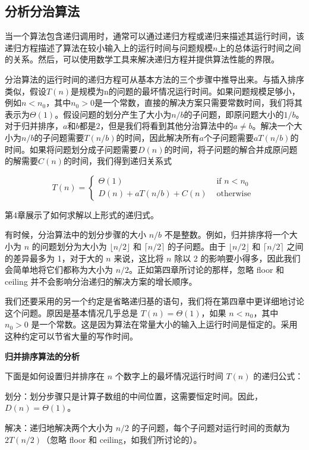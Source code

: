\documentclass[lang=cn,newtx,10pt,scheme=chinese]{elegantbook}
\begin{document}
\subsection{分析分治算法}

当一个算法包含递归调用时，通常可以通过递归方程或递归来描述其运行时间，该递归方程描述了算法在较小输入上的运行时间与问题规模$n$上的总体运行时间之间的关系。然后，可以使用数学工具来解决递归方程并提供算法性能的界限。

分治算法的运行时间的递归方程可从基本方法的三个步骤中推导出来。与插入排序类似，假设$T(n)$是规模为n的问题的最坏情况运行时间。如果问题规模足够小，例如$n < n_0$，其中$n_0 > 0$是一个常数，直接的解决方案只需要常数时间，我们将其表示为$\Theta(1)$。假设问题的划分产生了大小为$n/b$的子问题，即原问题大小的$1/b$。对于归并排序，$a$和$b$都是$2$，但是我们将看到其他分治算法中的$a\neq b$。解决一个大小为$n/b$的子问题需要$T(n/b)$的时间，因此解决所有$a$个子问题需要$aT(n/b)$的时间。如果将问题划分成子问题需要$D(n)$的时间，将子问题的解合并成原问题的解需要$C(n)$的时间，我们得到递归关系式

$$
T(n)= \begin{cases}\Theta(1) & \text { if } n<n_0 \\ D(n)+a T(n / b)+C(n) & \text { otherwise }\end{cases}
$$

第4章展示了如何求解以上形式的递归式。

有时候，分治算法中的划分步骤的大小 $n/b$ 不是整数。例如，归并排序将一个大小为 $n$ 的问题划分为大小为 $\lfloor{n/2}\rfloor$ 和 $\lceil{n/2}\rceil$ 的子问题。由于 $\lfloor{n/2}\rfloor$ 和 $\lceil{n/2}\rceil$ 之间的差异最多为 1，对于大的 $n$ 来说，这比将 $n$ 除以 2 的影响要小得多，因此我们会简单地将它们都称为大小为 $n/2$。正如第四章所讨论的那样，忽略 floor 和 ceiling 并不会影响分治递归的解决方案的增长顺序。

我们还要采用的另一个约定是省略递归基的语句，我们将在第四章中更详细地讨论这个问题。原因是基本情况几乎总是 $T(n)=\Theta(1)$，如果 $n < n_0$，其中 $n_0 > 0$ 是一个常数。这是因为算法在常量大小的输入上运行时间是恒定的。采用这种约定可以节省大量的写作时间。

\textbf{归并排序算法的分析}

下面是如何设置归并排序在 $n$ 个数字上的最坏情况运行时间 $T(n)$ 的递归公式：

划分：划分步骤只是计算子数组的中间位置，这需要恒定时间。因此，$D(n)=\Theta(1)$。

解决：递归地解决两个大小为 $n/2$ 的子问题，每个子问题对运行时间的贡献为 $2T(n/2)$（忽略 floor 和 ceiling，如我们所讨论的）。
\end{document}
